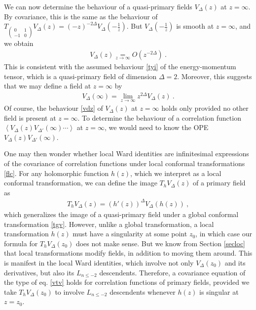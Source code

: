 \documentclass[12pt,a4paper,notitlepage]{report}
\numberwithin{equation}{section}
\theoremstyle{break}
\begin{document}
We can now determine the behaviour of a quasi-primary fields $V_\Delta(z)$ at $z=\infty$.
By covariance, this is the same as the behaviour of $T_{\left(\begin{smallmatrix} 0 & 1 \\ -1 & 0 \end{smallmatrix}\right)}V_\Delta(z)= (-z)^{-2\Delta}V_\Delta(-\frac{1}{z})$.
But $V_\Delta(-\frac{1}{z})$ is smooth at $z=\infty$, and we obtain
\begin{align}
 \boxed{V_\Delta(z) \underset{z\rightarrow \infty}{=} O\left(z^{-2\Delta}\right)}\ .
\label{vdz}
\end{align}
This is consistent with the assumed behaviour \eqref{tyi} of the energy-momentum tensor, which is a quasi-primary field of dimension $\Delta=2$.
Moreover, this suggests that we may define a field at $z=\infty$ by 
\begin{align}
 V_\Delta(\infty) = \underset{z\rightarrow \infty}{\lim} z^{2\Delta} V_\Delta(z)\ . 
\end{align}
Of course, the behaviour \eqref{vdz} of $V_\Delta(z)$ at $z=\infty$ holds only provided no other field is present at $z=\infty$.
To determine the behaviour of a correlation function $\left\langle V_\Delta(z) V_{\Delta'}(\infty)\cdots \right\rangle$ at $z=\infty$, we would need to know the OPE $V_\Delta(z) V_{\Delta'}(\infty)$.

One may then wonder whether local Ward identities are infinitesimal expressions of the covariance of correlation functions under local conformal transformations \eqref{flc}.
For any holomorphic function $h(z)$, which we interpret as a local conformal transformation, we can define the image $T_hV_\Delta(z)$ of a primary field as 
\begin{align}
 \boxed{T_h V_\Delta(z) = (h'(z))^{\Delta} V_\Delta(h(z))}\ ,
\label{thv}
\end{align}
which generalizes the image of a quasi-primary field under a global conformal transformation \eqref{tgv}.
However, unlike a global transformation, a local transformation $h(z)$ must have a singularity at some point $z_0$, in which case our formula for $T_hV_\Delta(z_0)$ does not make sense.
But we know from Section \ref{secloc} that local transformations modify fields, in addition to moving them around.
This is manifest in the local Ward identities, which involve not only $V_\Delta(z_0)$ and its derivatives, but also its $L_{n\leq -2}$ descendents. 
Therefore, a covariance equation of the type of eq. \eqref{vtv} holds for correlation functions of primary fields, provided we take $T_h V_\Delta(z_0)$ to involve $L_{n\leq -2}$ descendents whenever $h(z)$ is singular at $z=z_0$. 
\end{document}
